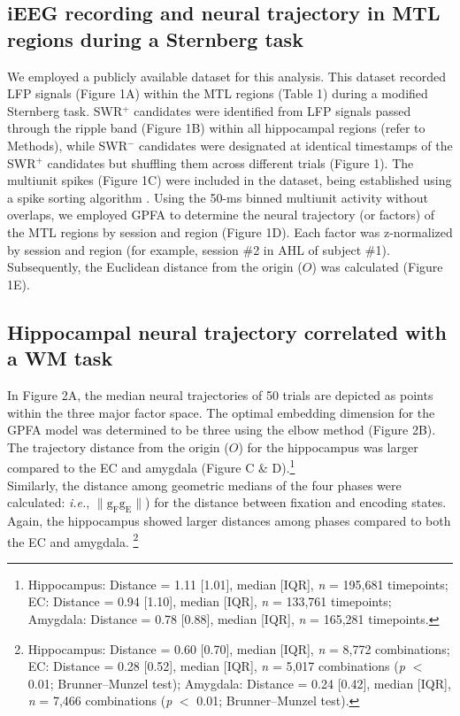 \documentclass[final,3p,times,twocolumn]{elsarticle}
\begin{document}
\subsection{iEEG recording and neural trajectory in MTL regions during a Sternberg task}
We employed a publicly available dataset \cite{boran_dataset_2020} for this analysis. This dataset recorded LFP signals (Figure 1A) within the MTL regions (Table 1) during a modified Sternberg task. SWR$^+$ candidates were identified from LFP signals passed through the ripple band (Figure 1B) within all hippocampal regions (refer to Methods), while SWR$^-$ candidates were designated at identical timestamps of the SWR$^+$ candidates but shuffling them across different trials (Figure 1). The multiunit spikes (Figure 1C) were included in the dataset, being established using a spike sorting algorithm \cite{niediek_reliable_2016}. Using the 50-ms binned multiunit activity without overlaps, we employed GPFA \cite{yu_gaussian-process_2009} to determine the neural trajectory (or factors) of the MTL regions by session and region (Figure 1D). Each factor was z-normalized by session and region (for example, session \#2 in AHL of subject \#1). Subsequently, the Euclidean distance from the origin ($O$) was calculated (Figure 1E).

\subsection{Hippocampal neural trajectory correlated with a WM task}
In Figure 2A, the median neural trajectories of 50 trials are depicted as points within the three major factor space. The optimal embedding dimension for the GPFA model was determined to be three using the elbow method (Figure 2B). The trajectory distance from the origin ($O$) for the hippocampus was larger compared to the EC and amygdala (Figure C \& D).\footnote{Hippocampus: Distance = 1.11 [1.01], median [IQR], \textit{n} = 195,681 timepoints; EC: Distance = 0.94 [1.10], median [IQR], \textit{n} = 133,761 timepoints; Amygdala: Distance = 0.78 [0.88], median [IQR], \textit{n} = 165,281 timepoints.}
\\
\indent
Similarly, the distance among geometric medians of the four phases were calculated: \textit{i.e.}, $\mathrm{\lVert g_{F}g_{E} \rVert}$) for the distance between fixation and encoding states. Again, the hippocampus showed larger distances among phases compared to both the EC and amygdala. \footnote{Hippocampus: Distance = 0.60 [0.70], median [IQR], \textit{n} = 8,772 combinations; EC: Distance = 0.28 [0.52], median [IQR], \textit{n} = 5,017 combinations (\textit{p} $<$ 0.01; Brunner--Munzel test); Amygdala: Distance = 0.24 [0.42], median [IQR], \textit{n} = 7,466 combinations (\textit{p} $<$ 0.01; Brunner--Munzel test).}
\end{document}
